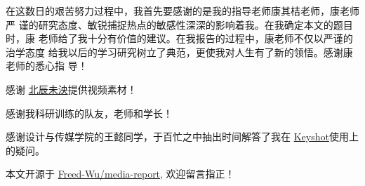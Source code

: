\documentclass[../main]{subfiles}
\begin{document}
\begin{acknowledgement}

  在这数日的艰苦努力过程中，我首先要感谢的是我的指导老师康其桔老师，康老师严
  谨的研究态度、敏锐捕捉热点的敏感性深深的影响着我。在我确定本文的题目时，康
  老师给了我十分有价值的建议。在我报告的过程中，康老师不仅以严谨的治学态度
  给我以后的学习研究树立了典范，更使我对人生有了新的领悟。感谢康老师的悉心指
  导！

  感谢
  \href{https://space.bilibili.com/3267707?spm_id_from=333.788.b_765f7570696e666f.2}{%
  北辰未泱}提供视频素材！

  感谢我科研训练的队友，老师和学长！

  感谢设计与传媒学院的王懿同学，于百忙之中抽出时间解答了我在
  \href{https://www.keyshot.com/}{Keyshot}使用上的疑问。

  本文开源于
  \href{https://github.com/Freed-Wu/media-report}{Freed-Wu/media-report},
  欢迎留言指正！
\end{acknowledgement}
\end{document}
